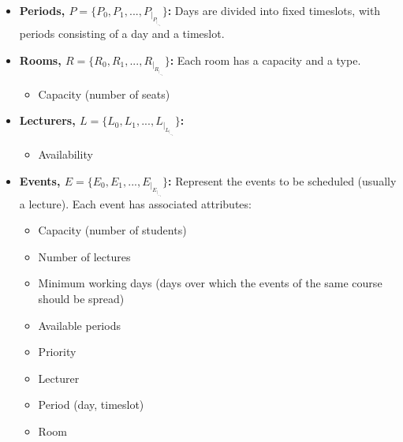 \begin{itemize}
	\item \textbf{Periods, \(P = \{P_0, P_1, ..., P_|_P_|_-_1\}\):} Days are divided into fixed timeslots, with periods consisting of a day and a timeslot.


	\item \textbf{Rooms, \(R = \{R_0, R_1, ..., R_|_R_|_-_1\}\):} Each room has a capacity and a type.
		\begin{itemize}
			\item Capacity (number of seats)
		\end{itemize}

	\item \textbf{Lecturers, \(L = \{L_0, L_1, ..., L_|_L_|_-_1\}\):} 
		\begin{itemize}
			\item Availability
		\end{itemize}

	\item \textbf{Events, \(E = \{E_0, E_1, ..., E_|_E_|_-_1\}\):} Represent the events to be scheduled (usually a lecture). Each event has associated attributes:
		\begin{itemize}
        		\item Capacity (number of students)
        		\item Number of lectures
        		\item Minimum working days (days over which the events of the same course should be spread)
        		\item Available periods
        		\item Priority
        		\item Lecturer
        		\item Period (day, timeslot)
 			\item Room
		\end{itemize}


\end{itemize}
